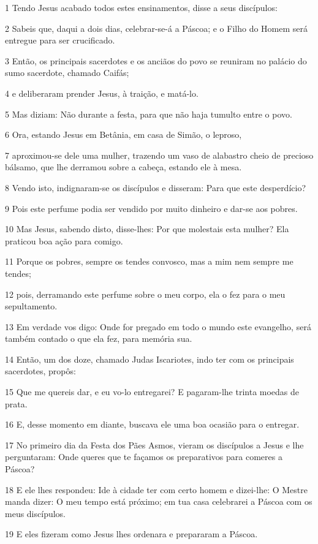 \par 1 Tendo Jesus acabado todos estes ensinamentos, disse a seus discípulos:
\par 2 Sabeis que, daqui a dois dias, celebrar-se-á a Páscoa; e o Filho do Homem será entregue para ser crucificado.
\par 3 Então, os principais sacerdotes e os anciãos do povo se reuniram no palácio do sumo sacerdote, chamado Caifás;
\par 4 e deliberaram prender Jesus, à traição, e matá-lo.
\par 5 Mas diziam: Não durante a festa, para que não haja tumulto entre o povo.
\par 6 Ora, estando Jesus em Betânia, em casa de Simão, o leproso,
\par 7 aproximou-se dele uma mulher, trazendo um vaso de alabastro cheio de precioso bálsamo, que lhe derramou sobre a cabeça, estando ele à mesa.
\par 8 Vendo isto, indignaram-se os discípulos e disseram: Para que este desperdício?
\par 9 Pois este perfume podia ser vendido por muito dinheiro e dar-se aos pobres.
\par 10 Mas Jesus, sabendo disto, disse-lhes: Por que molestais esta mulher? Ela praticou boa ação para comigo.
\par 11 Porque os pobres, sempre os tendes convosco, mas a mim nem sempre me tendes;
\par 12 pois, derramando este perfume sobre o meu corpo, ela o fez para o meu sepultamento.
\par 13 Em verdade vos digo: Onde for pregado em todo o mundo este evangelho, será também contado o que ela fez, para memória sua.
\par 14 Então, um dos doze, chamado Judas Iscariotes, indo ter com os principais sacerdotes, propôs:
\par 15 Que me quereis dar, e eu vo-lo entregarei? E pagaram-lhe trinta moedas de prata.
\par 16 E, desse momento em diante, buscava ele uma boa ocasião para o entregar.
\par 17 No primeiro dia da Festa dos Pães Asmos, vieram os discípulos a Jesus e lhe perguntaram: Onde queres que te façamos os preparativos para comeres a Páscoa?
\par 18 E ele lhes respondeu: Ide à cidade ter com certo homem e dizei-lhe: O Mestre manda dizer: O meu tempo está próximo; em tua casa celebrarei a Páscoa com os meus discípulos.
\par 19 E eles fizeram como Jesus lhes ordenara e prepararam a Páscoa.
